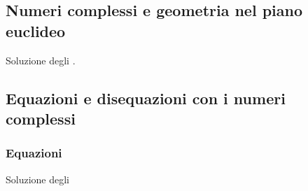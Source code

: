 \documentclass[letterpaper,10pt,italian]{jupyterBook}
\begin{document}
\subsection{Numeri complessi e geometria nel piano euclideo}
\label{\detokenize{ch/algebra/complex-algebra-sol:numeri-complessi-e-geometria-nel-piano-euclideo}}\label{\detokenize{ch/algebra/complex-algebra-sol:math-hs-algebra-complex-problems-geometry-2d-sol}}
\sphinxAtStartPar
Soluzione degli {\hyperref[\detokenize{ch/algebra/complex-algebra-problems:math-hs:algebra:complex:problems:geometry-2d:ex}]{}}.


\subsection{Equazioni e disequazioni con i numeri complessi}
\label{\detokenize{ch/algebra/complex-algebra-sol:equazioni-e-disequazioni-con-i-numeri-complessi}}\label{\detokenize{ch/algebra/complex-algebra-sol:math-hs-algebra-complex-problems-equations-sol}}

\subsubsection{Equazioni}
\label{\detokenize{ch/algebra/complex-algebra-sol:equazioni}}
\sphinxAtStartPar
Soluzione degli {\hyperref[\detokenize{ch/algebra/complex-algebra-problems:math-hs-algebra-complex-problems-equations-sys}]{}}
\end{document}
